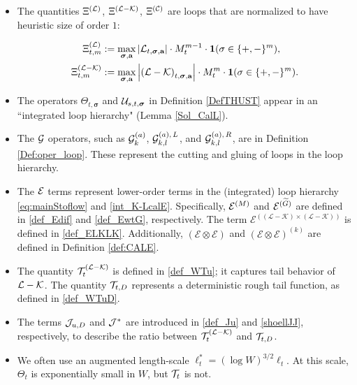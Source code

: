 \begin{itemize}
    
    \item The quantities $\Xi^{({\cal L})}$, $\Xi^{({\cal L-K})}$, $\Xi^{({\cal C})}$ are loops that are normalized to have heuristic size of order $1$:
    
    \begin{align}
\Xi^{({\cal L})}_{t, m}&:= \max_{\boldsymbol{\sigma}, \textbf{a}} 
\left|{\cal L}_{t, \boldsymbol{\sigma}, \textbf{a}} \right|\cdot M_{t}^{m-1} \cdot {\bf 1}(\sigma \in \{+,-\}^m),
\label{def:XiL} \\
\Xi^{({\cal L-K})}_{t, m}&:= \max_{\boldsymbol{\sigma}, \textbf{a}}
\left|{ ({\cal L-K})}_{t, \boldsymbol{\sigma}, \textbf{a}} \right|\cdot M_{t}^{m }\cdot {\bf 1}(\sigma \in \{+,-\}^m).
\nonumber
\end{align}
\item The operators $\varTheta_{t,\boldsymbol{\sigma}}$ and ${\cal U}_{s, t,\boldsymbol{\sigma}}$ in Definition \ref{DefTHUST} appear in an ``integrated loop hierarchy" (Lemma \ref{Sol_CalL}). 
\item  The \(\cal G\) operators, such as \({\cal G}^{(a)}_k\), \({\cal G}^{(a),\,L}_{k,l}\), and \({\cal G}^{(a),\,R}_{k,l}\), are in Definition \ref{Def:oper_loop}. These represent the cutting and gluing of loops in the loop hierarchy.
 
 
\item  The \(\cal E\) terms represent lower-order terms in the (integrated) loop hierarchy \eqref{eq:mainStoflow} and \eqref{int_K-LcalE}. Specifically, \({\cal E}^{(M)}\) and \({\cal E}^{(\widetilde{G})}\) are defined in \eqref{def_Edif} and \eqref{def_EwtG}, respectively. The term \(\mathcal{E}^{((\mathcal{L}-\mathcal{K}) \times (\mathcal{L}-\mathcal{K}))}\) is defined in \eqref{def_ELKLK}. Additionally, \(\left( \mathcal{E} \otimes \mathcal{E} \right)\) and \(\left( \mathcal{E} \otimes \mathcal{E} \right)^{(k)}\) are defined in Definition \ref{def:CALE}.

\item  The quantity \({\cal T}^{(\cal L-\cal K)}_{t}\) is defined in \eqref{def_WTu}; it captures tail behavior of ${\cal L}-{\cal K}$. The quantity \({\cal T}_{t,D}\) represents a deterministic rough tail function, as defined in \eqref{def_WTuD}. 
\item The terms \({\cal J}_{u,D}\) and \(\cal J^*\) are introduced in \eqref{def_Ju} and \eqref{shoellJJ}, respectively, to describe the ratio between \({\cal T}^{(\cal L-\cal K)}_{t}\) and \({\cal T}_{t,D}\).

\item We often use an augmented length-scale $\ell_t^*=(\log W)^{3/2}\ell_t$. At this scale, $\Theta_t$ is exponentially small in $W$, but ${\cal T}_t$ is not. 
 

\end{itemize}
